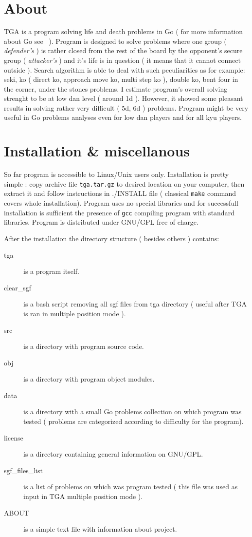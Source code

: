 \section{About} 
TGA is a program solving life and death problems in Go ( for more information about Go see~\cite{web:senseis_library} ).
Program is designed to solve problems where one group ( {\it defender's} ) is rather closed from the rest of the board by the opponent's secure group
( {\it attacker's} ) and it's life is in question ( it means that it cannot connect outside ). Search algorithm is able to deal with such
peculiarities as for example: seki, ko ( direct ko, approach move ko, multi step ko ), double ko, bent four in the corner, under the stones problems. I
estimate program's overall solving strenght to be at low dan level ( around 1d ). However, it showed some pleasant results in solving rather very
difficult ( 5d, 6d ) problems. Program might be very useful in Go problems analyses even for low dan players and for all kyu players.

\section{Installation \& miscellanous}
So far program is accessible to Linux/Unix users only. Installation is pretty simple : copy archive file {\tt tga.tar.gz} to desired location on your
computer, then extract it and follow instructions in ./INSTALL file ( classical {\tt make} command covers whole installation). Program uses no special
libraries and for successfull installation is sufficient the presence of {\tt gcc} compiling program with standard libraries. Program is distributed under
GNU/GPL free of charge. 

After the installation the directory structure ( besides others ) contains: 
\begin {description}
	\item [tga] is a program itself.
	\item [clear\_sgf] is a bash script removing all sgf files from tga directory ( useful after TGA is ran in multiple position mode ).
	\item [src] is a directory with program source code.
	\item [obj] is a directory with program object modules.
	\item [data] is a directory with a small Go problems collection on which program was tested ( problems are categorized according to difficulty for
		the program).  
	\item [license] is a directory containing general information on GNU/GPL.
	\item [sgf\_files\_list] is a list of problems on which was program tested ( this file was used as input in TGA multiple position mode ).
	\item [ABOUT] is a simple text file with information about project.
\end {description}


